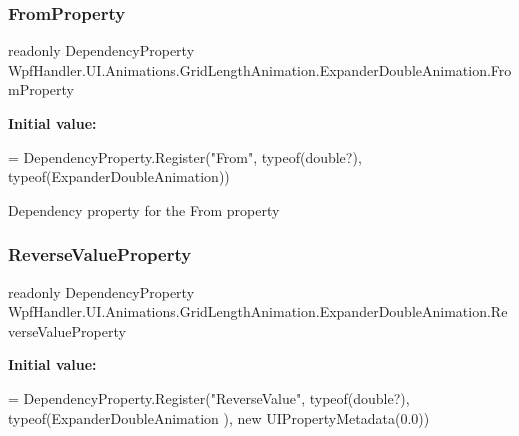 \subsubsection{\texorpdfstring{From\+Property}{FromProperty}}
{\footnotesize\ttfamily readonly Dependency\+Property Wpf\+Handler.\+U\+I.\+Animations.\+Grid\+Length\+Animation.\+Expander\+Double\+Animation.\+From\+Property\hspace{0.3cm}{\ttfamily [static]}}

{\bfseries Initial value\+:}
\begin{DoxyCode}
= DependencyProperty.Register(\textcolor{stringliteral}{"From"}, typeof(\textcolor{keywordtype}{double}?),
                    typeof(ExpanderDoubleAnimation))
\end{DoxyCode}


Dependency property for the From property 

\mbox{\label{class_wpf_handler_1_1_u_i_1_1_animations_1_1_grid_length_animation_1_1_expander_double_animation_a31911e20e670e43ed1fc9b112f28ef68}} 
\subsubsection{\texorpdfstring{Reverse\+Value\+Property}{ReverseValueProperty}}
{\footnotesize\ttfamily readonly Dependency\+Property Wpf\+Handler.\+U\+I.\+Animations.\+Grid\+Length\+Animation.\+Expander\+Double\+Animation.\+Reverse\+Value\+Property\hspace{0.3cm}{\ttfamily [static]}}

{\bfseries Initial value\+:}
\begin{DoxyCode}
=
                DependencyProperty.Register(\textcolor{stringliteral}{"ReverseValue"}, typeof(\textcolor{keywordtype}{double}?), typeof(ExpanderDoubleAnimation
      ), \textcolor{keyword}{new} UIPropertyMetadata(0.0))
\end{DoxyCode}


